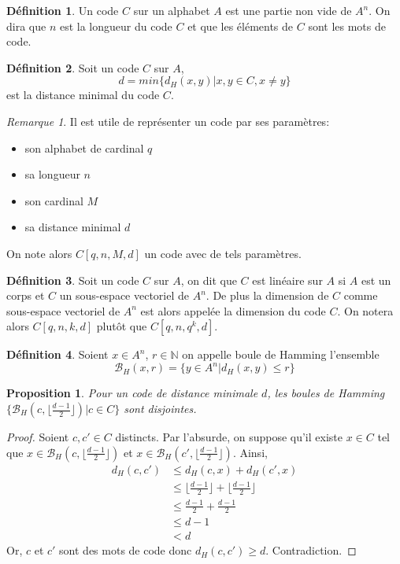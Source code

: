 \documentclass{article}
\newtheorem{proposition}{Proposition}
\theoremstyle{definition}
\newtheorem{definition}{Définition}
\theoremstyle{remark}
\newtheorem{remark}{Remarque}
\begin{document}
\begin{definition}
\label{def2}
    Un code $C$ sur un alphabet $A$ est une partie non vide de $A^n$. On dira que $n$ est la longueur du code $C$ et que les éléments de $C$ sont les mots de code.  
\end{definition}

\begin{definition}
\label{def3}
    Soit un code $C$ sur $A$,
    \[ d = min\{d_H(x, y) | x, y \in C, x\ne y \}\]
    est la distance minimal du code $C$.
\end{definition}

\begin{remark}
    Il est utile de représenter un code par ses paramètres:
    \begin{itemize}
        \item son alphabet de cardinal $q$
        \item sa longueur $n$
        \item son cardinal $M$
        \item sa distance minimal $d$
    \end{itemize}
    On note alors $C[q, n, M, d]$ un code avec de tels paramètres.
\end{remark}

\begin{definition}
\label{def4}
    Soit un code $C$ sur $A$, on dit que $C$ est linéaire sur $A$ si $A$ est un corps et $C$ un sous-espace vectoriel de $A^n$. De plus la dimension de $C$ comme sous-espace vectoriel de $A^n$ est alors appelée la dimension du code $C$. On notera alors $C[q, n, k, d]$ plutôt que $C[q, n, q^k, d]$.
\end{definition}

\begin{definition}
    Soient $x \in A^n$, $r \in \mathbb{N}$ on appelle boule de Hamming l'ensemble
    \[ \mathcal{B}_H(x, r) = \{y \in A^n | d_H(x, y) \le r\} \]
\end{definition}

\begin{proposition}
    Pour un code de distance minimale $d$, les boules de Hamming $\{ \mathcal{B}_H(c, \lfloor \frac{d-1}{2} \rfloor) | c \in C\}$ sont disjointes.
\end{proposition}

\begin{proof}
    Soient $c, c' \in C$ distincts. Par l'absurde, on suppose qu'il existe $x \in C$ tel que $x \in \mathcal{B}_H(c, \lfloor \frac{d-1}{2} \rfloor)$ et $x \in \mathcal{B}_H(c', \lfloor \frac{d-1}{2} \rfloor)$. Ainsi,
    \begin{align*}
        d_H(c, c') &\le d_H(c, x) + d_H(c', x) \\
                   &\le \lfloor \frac{d-1}{2} \rfloor + \lfloor \frac{d-1}{2} \rfloor \\
                   &\le \frac{d-1}{2} + \frac{d-1}{2} \\
                   &\le d - 1 \\
                   &< d 
    \end{align*}
    Or, $c$ et $c'$ sont des mots de code donc $d_H(c, c') \ge d$. Contradiction.
\end{proof}
\end{document}
